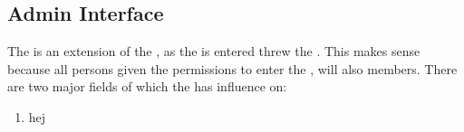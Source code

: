 \subsection{Admin Interface}
\label{sec:admininterface}

The \ainterface[] is an extension of the \sinterface[], as the \ainterface[] is entered threw the \sinterface[]. This makes sense because all persons given the permissions to enter the \ainterface[], will also \astaff[] members. There are two major fields of which the \admin[] has influence on:

\begin{enumerate}
	\item hej
\end{enumerate}